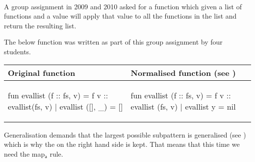 \begin{example}\
  \label{ex:map-instance-evallist}\\
  A group assignment in 2009 and 2010 asked for a function  which
  given a list of functions and a value will apply that value to all the
  functions in the list and return the resulting list.

  The below  function was written as part of this group assignment
  by four students.
  \begin{center}
    \begin{tabular}{|l|l|}
      \hline
      \textbf{Original function}
      &
      \textbf{Normalised function}
      \footnotesize{(see \fref{tr:trace-normalise-evallist})}
      \\ \hline
      \begin{sml}
fun evallist (f :: fs, v) =
      f v :: evallist(fs, v)
  | evallist ([], _) = []
      \end{sml}
      &
      \begin{sml}
fun evallist (f :: fs, v) =
      f v :: evallist (fs, v)
  | evallist y = nil
      \end{sml}
      \\ \hline
    \end{tabular}
  \end{center}
  Generalisation demands that the largest possible subpattern is generalised
  (see \fref{def:gener-patt}) which is why the \ttt{nil} on the right hand side
  is kept. That means that this time we need the \textsf{map$_\textsf{a}$} rule.


\end{example}
